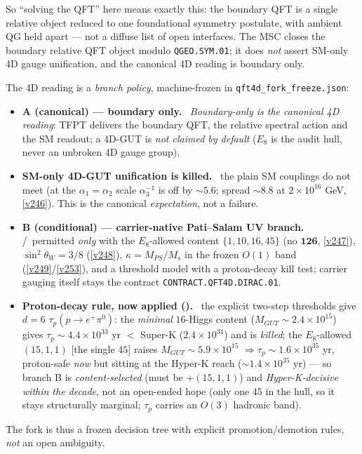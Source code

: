 So ``solving the QFT'' here means exactly this: the boundary QFT is a single relative object reduced to
one foundational symmetry postulate, with ambient QG held apart --- not a diffuse list of open interfaces.
The MSC closes the boundary relative QFT object modulo \texttt{QGEO.SYM.01}; it does \emph{not} assert
SM-only 4D gauge unification, and the canonical 4D reading is boundary only.
\begin{keybox}
The 4D reading is a \emph{branch policy}, machine-frozen in \texttt{qft4d\_fork\_freeze.json}:
\begin{itemize}\setlength\itemsep{1pt}
\item \textbf{A (canonical) --- boundary only.} \mC\ \emph{Boundary-only is the canonical 4D reading}:
  TFPT delivers the boundary QFT, the relative spectral action and the SM readout; a 4D-GUT is
  \emph{not claimed by default} ($E_8$ is the audit hull, never an unbroken 4D gauge group).
\item \textbf{SM-only 4D-GUT unification is killed.} \mX\ the plain SM couplings do not meet (at the
  $\alpha_1{=}\alpha_2$ scale $\alpha_3^{-1}$ is off by ${\sim}5.6$; spread ${\sim}8.8$ at $2{\times}10^{16}$
  GeV, \vref{v246}). This is the canonical \emph{expectation}, not a failure.
\item \textbf{B (conditional) --- carrier-native Pati--Salam UV branch.} \mC/\mO\ permitted \emph{only}
  with the $E_8$-allowed content $\{1,10,16,45\}$ (no $\mathbf{126}$, \vref{v247}), $\sin^2\theta_W{=}3/8$
  (\vref{v248}), $\kappa{=}M_{PS}/M_s$ in the frozen $O(1)$ band (\vref{v249}/\vref{v253}), and a threshold
  model with a proton-decay kill test; carrier gauging itself stays the contract \texttt{CONTRACT.QFT4D.DIRAC.01}.
\item \textbf{Proton-decay rule, now applied ().} \mX\ the explicit
  two-step thresholds give $d{=}6$ $\tau_p(p{\to}e^+\pi^0)$: the \emph{minimal} $16$-Higgs content
  ($M_{GUT}{\sim}2.4{\times}10^{15}$) gives $\tau_p{\sim}4.4{\times}10^{33}$ yr $<$ Super-K
  ($2.4{\times}10^{34}$) and is \emph{killed}; the $E_8$-allowed $(15,1,1)$ [the single $45$] raises
  $M_{GUT}{\sim}5.9{\times}10^{15}$ $\Rightarrow\tau_p{\sim}1.6{\times}10^{35}$ yr, proton-safe \emph{now}
  but sitting at the Hyper-K reach (${\sim}1.4{\times}10^{35}$ yr) --- so branch B is \emph{content-selected}
  (must be $+(15,1,1)$) and \emph{Hyper-K-decisive within the decade}, not an open-ended hope (only one $45$
  in the hull, so it stays structurally marginal; $\tau_p$ carries an $O(3)$ hadronic band).
\end{itemize}
The fork is thus a frozen decision tree with explicit promotion/demotion rules, \emph{not} an open ambiguity.
\end{keybox}
